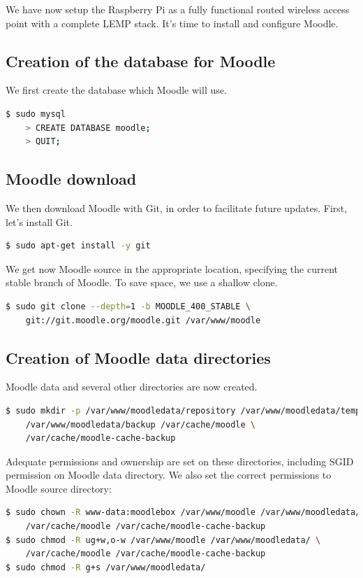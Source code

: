 \documentclass[12pt]{article}
\begin{document}
We have now setup the Raspberry Pi as a fully functional routed wireless access point with a complete LEMP stack.
It's time to install and configure Moodle.

\subsection{Creation of the database for Moodle}

We first create the database which Moodle will use.
\begin{lstlisting}[language=bash]
$ sudo mysql
    > CREATE DATABASE moodle;
    > QUIT;
\end{lstlisting}

\subsection{Moodle download}

We then download Moodle with Git, in order to facilitate future updates.
First, let's install Git.
\begin{lstlisting}[language=bash]
$ sudo apt-get install -y git
\end{lstlisting}

We get now Moodle source in the appropriate location, specifying the current stable branch of Moodle.
To save space, we use a shallow clone.
\begin{lstlisting}[language=bash]
$ sudo git clone --depth=1 -b MOODLE_400_STABLE \
    git://git.moodle.org/moodle.git /var/www/moodle
\end{lstlisting}

\subsection{Creation of Moodle data directories}

Moodle data and several other directories are now created.
\begin{lstlisting}[language=bash]
$ sudo mkdir -p /var/www/moodledata/repository /var/www/moodledata/temp \
    /var/www/moodledata/backup /var/cache/moodle \
    /var/cache/moodle-cache-backup
\end{lstlisting}
Adequate permissions and ownership are set on these directories, including SGID permission on Moodle data directory.
We also set the correct permissions to Moodle source directory:
\begin{lstlisting}[language=bash]
$ sudo chown -R www-data:moodlebox /var/www/moodle /var/www/moodledata/ \
    /var/cache/moodle /var/cache/moodle-cache-backup
$ sudo chmod -R ug+w,o-w /var/www/moodle /var/www/moodledata/ \
    /var/cache/moodle /var/cache/moodle-cache-backup
$ sudo chmod -R g+s /var/www/moodledata/
\end{lstlisting}
\end{document}
